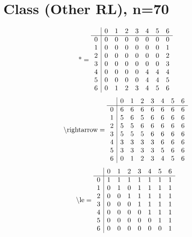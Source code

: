 \documentclass[11pt]{article}
\begin{document}
\section{Class (Other RL), n=70}
\[\text{*} = 
\begin{array}{r | r r r r r r r}
 & 0 & 1 & 2 & 3 & 4 & 5 & 6 \\ \hline
0 & 0 & 0 & 0 & 0 & 0 & 0 & 0 \\
1 & 0 & 0 & 0 & 0 & 0 & 0 & 1 \\
2 & 0 & 0 & 0 & 0 & 0 & 0 & 2 \\
3 & 0 & 0 & 0 & 0 & 0 & 0 & 3 \\
4 & 0 & 0 & 0 & 0 & 4 & 4 & 4 \\
5 & 0 & 0 & 0 & 0 & 4 & 4 & 5 \\
6 & 0 & 1 & 2 & 3 & 4 & 5 & 6 \\
\end{array}
\]
\[\text{\textbackslash rightarrow} = 
\begin{array}{r | r r r r r r r}
 & 0 & 1 & 2 & 3 & 4 & 5 & 6 \\ \hline
0 & 6 & 6 & 6 & 6 & 6 & 6 & 6 \\
1 & 5 & 6 & 5 & 6 & 6 & 6 & 6 \\
2 & 5 & 5 & 6 & 6 & 6 & 6 & 6 \\
3 & 5 & 5 & 5 & 6 & 6 & 6 & 6 \\
4 & 3 & 3 & 3 & 3 & 6 & 6 & 6 \\
5 & 3 & 3 & 3 & 3 & 5 & 6 & 6 \\
6 & 0 & 1 & 2 & 3 & 4 & 5 & 6 \\
\end{array}
\]
\[\text{\textbackslash le} = 
\begin{array}{r | r r r r r r r}
 & 0 & 1 & 2 & 3 & 4 & 5 & 6 \\ \hline
0 & 1 & 1 & 1 & 1 & 1 & 1 & 1 \\
1 & 0 & 1 & 0 & 1 & 1 & 1 & 1 \\
2 & 0 & 0 & 1 & 1 & 1 & 1 & 1 \\
3 & 0 & 0 & 0 & 1 & 1 & 1 & 1 \\
4 & 0 & 0 & 0 & 0 & 1 & 1 & 1 \\
5 & 0 & 0 & 0 & 0 & 0 & 1 & 1 \\
6 & 0 & 0 & 0 & 0 & 0 & 0 & 1 \\
\end{array}
\]
\end{document}
